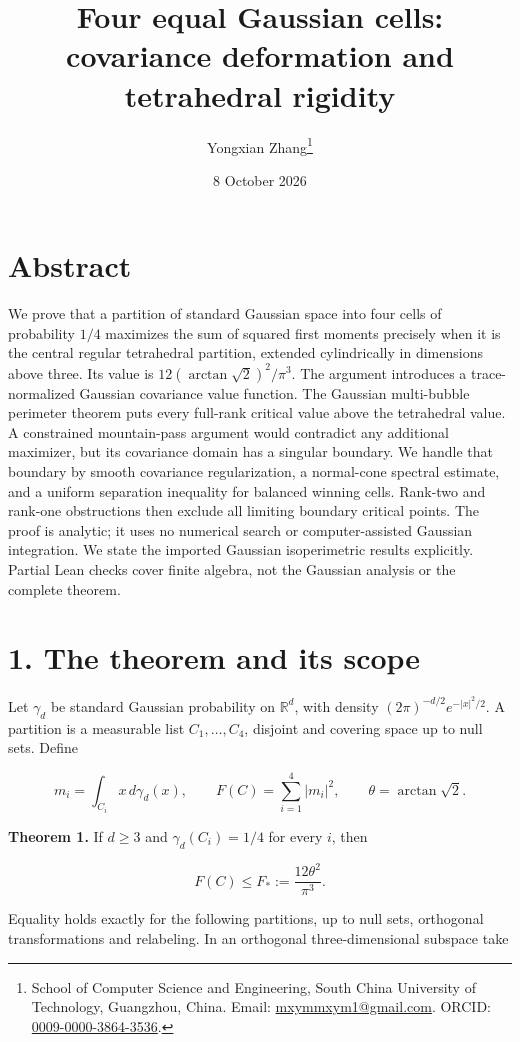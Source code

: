 \documentclass[
  11pt,
]{article}
\title{Four equal Gaussian cells: covariance deformation and tetrahedral
rigidity}
\author{Yongxian Zhang\thanks{School of Computer Science and Engineering,
South China University of Technology, Guangzhou, China.
Email: \href{mailto:mxymmxym1@gmail.com}{mxymmxym1@gmail.com}.
ORCID: \href{https://orcid.org/0009-0000-3864-3536}{0009-0000-3864-3536}.}}
\date{8 October 2026}
\begin{document}
\maketitle

\section{Abstract}\label{abstract}

We prove that a partition of standard Gaussian space into four cells of
probability \(1/4\) maximizes the sum of squared first moments precisely
when it is the central regular tetrahedral partition, extended
cylindrically in dimensions above three. Its value is
\(12(\arctan\sqrt2)^2/\pi^3\). The argument introduces a
trace-normalized Gaussian covariance value function. The Gaussian
multi-bubble perimeter theorem puts every full-rank critical value above
the tetrahedral value. A constrained mountain-pass argument would
contradict any additional maximizer, but its covariance domain has a
singular boundary. We handle that boundary by smooth covariance
regularization, a normal-cone spectral estimate, and a uniform
separation inequality for balanced winning cells. Rank-two and rank-one
obstructions then exclude all limiting boundary critical points. The
proof is analytic; it uses no numerical search or computer-assisted
Gaussian integration. We state the imported Gaussian isoperimetric
results explicitly. Partial Lean checks cover finite algebra, not the
Gaussian analysis or the complete theorem.

\section{1. The theorem and its scope}\label{the-theorem-and-its-scope}

Let \(\gamma_d\) be standard Gaussian probability on \(\mathbb R^d\),
with density \((2\pi)^{-d/2}e^{-|x|^2/2}\). A partition is a measurable
list \(C_1,\ldots,C_4\), disjoint and covering space up to null sets.
Define

\[
 m_i=\int_{C_i}x\,d\gamma_d(x),\qquad F(C)=\sum_{i=1}^4|m_i|^2,
 \qquad \theta=\arctan\sqrt2.
\]

\textbf{Theorem 1.} If \(d\ge3\) and \(\gamma_d(C_i)=1/4\) for every
\(i\), then

\[
 F(C)\le F_*:=\frac{12\theta^2}{\pi^3}.                 \tag{1}
\]

Equality holds exactly for the following partitions, up to null sets,
orthogonal transformations and relabeling. In an orthogonal
three-dimensional subspace take
\end{document}
